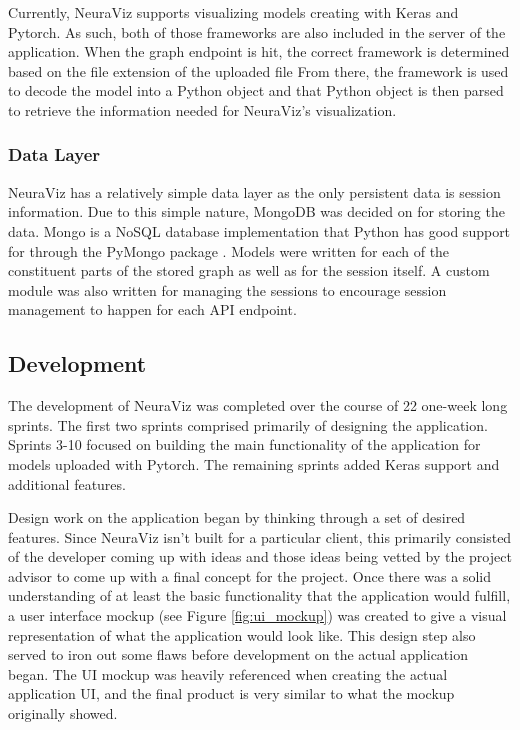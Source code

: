Currently, NeuraViz supports visualizing models creating with Keras and Pytorch. As such, both of those frameworks are also included in the server of the application. When the graph endpoint is hit, the correct framework is determined based on the file extension of the uploaded file From there, the framework is used to decode the model into a Python object and that Python object is then parsed to retrieve the information needed for NeuraViz's visualization.

\subsubsection{Data Layer}
NeuraViz has a relatively simple data layer as the only persistent data is session information. Due to this simple nature, MongoDB \cite{mongodb} was decided on for storing the data. Mongo is a NoSQL database implementation that Python has good support for through the PyMongo package \cite{pymongo}. Models were written for each of the constituent parts of the stored graph as well as for the session itself. A custom module was also written for managing the sessions to encourage session management to happen for each API endpoint.

\subsection{Development}
The development of NeuraViz was completed over the course of 22 one-week long sprints. The first two sprints comprised primarily of designing the application. Sprints 3-10 focused on building the main functionality of the application for models uploaded with Pytorch. The remaining sprints added Keras support and additional features.

Design work on the application began by thinking through a set of desired features. Since NeuraViz isn't built for a particular client, this primarily consisted of the developer coming up with ideas and those ideas being vetted by the project advisor to come up with a final concept for the project. Once there was a solid understanding of at least the basic functionality that the application would fulfill, a user interface mockup (see Figure \ref{fig:ui_mockup}) was created to give a visual representation of what the application would look like. This design step also served to iron out some flaws before development on the actual application began. The UI mockup was heavily referenced when creating the actual application UI, and the final product is very similar to what the mockup originally showed.


